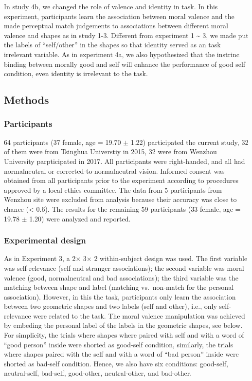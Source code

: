 \documentclass[man]{apa6}
\begin{document}
In study 4b, we changed the role of valence and identity in task. In this experiment, participants learn the association between moral valence and the made perceptual match judgements to associations between different moral valence and shapes as in study 1-3. Different from experiment 1 \textasciitilde{} 3, we made put the labels of \enquote{self/other} in the shapes so that identity served as an task irrelevant variable. As in experiment 4a, we also hypothesized that the instrinc binding between morally good and self will enhance the performance of good self condition, even identity is irrelevant to the task.

\hypertarget{methods-1}{%
\subsection{Methods}\label{methods-1}}

\hypertarget{participants-6}{%
\subsubsection{Participants}\label{participants-6}}

64 participants (37 female, age = 19.70 \(\pm\) 1.22) participated the current study, 32 of them were from Tsinghua Universtiy in 2015, 32 were from Wenzhou University parpticipated in 2017. All participants were right-handed, and all had normalneutral or corrected-to-normalneutral vision. Informed consent was obtained from all participants prior to the experiment according to procedures approved by a local ethics committee. The data from 5 participants from Wenzhou site were excluded from analysis because their accuracy was close to chance (\textless{} 0.6). The results for the remaining 59 participants (33 female, age = 19.78 \(\pm\) 1.20) were analyzed and reported.

\hypertarget{experimental-design}{%
\subsubsection{Experimental design}\label{experimental-design}}

As in Experiment 3, a 2× 3× 2 within-subject design was used. The first variable was self-relevance (self and stranger associations); the second variable was moral valence (good, normalneutral and bad associations); the third variable was the matching between shape and label (matching vs.~non-match for the personal association).
However, in this the task, participants only learn the association between two geometric shapes and two labels (self and other), i.e., only self-relevance were related to the task. The moral valence manipulation was achieved by embeding the personal label of the labels in the geometric shapes, see below. For simplicity, the trials where shapes where paired with self and with a word of \enquote{good person} inside were shorted as good-self condition, similarly, the trials where shapes paired with the self and with a word of \enquote{bad person} inside were shorted as bad-self condition. Hence, we also have six conditions: good-self, neutral-self, bad-self, good-other, neutral-other, and bad-other.
\end{document}
